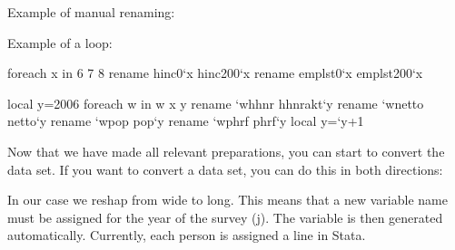 \documentclass[letterpaper,10pt,openany,onesideH,english]{sphinxmanual}
\begin{document}
Example of manual renaming:

%
\begin{sphinxVerbatim}[commandchars=\\\{\},numbers=left,firstnumber=1,stepnumber=1]
  
           
	  
	  
	  
	  
	  
\end{sphinxVerbatim}

Example of a loop:

%
\begin{sphinxVerbatim}[commandchars=\\\{\},numbers=left,firstnumber=1,stepnumber=1]
	foreach  x in 6 7 8 \PYGZob{}
		rename hinc0{}`x\PYGZsq{} hinc200{}`x\PYGZsq{}
		rename emplst0{}`x\PYGZsq{} emplst200{}`x\PYGZsq{}
		\PYGZcb{}

		
	local y=2006
	foreach w in w x y \PYGZob{}
		rename {}`w\PYGZsq{}hhnr hhnrakt{}`y\PYGZsq{}
		rename {}`w\PYGZsq{}netto netto{}`y\PYGZsq{}
		rename {}`w\PYGZsq{}pop pop{}`y\PYGZsq{}
		rename {}`w\PYGZsq{}phrf phrf{}`y\PYGZsq{}
		local y={}`y\PYGZsq{}+1
		\PYGZcb{}
\end{sphinxVerbatim}


Now that we have made all relevant preparations, you can start to convert the data set.
If you want to convert a data set, you can do this in both directions:

\begin{figure}[H]
\centering

\noindent{}
\end{figure}

In our case we reshap from wide to long. This means that a new variable name must be assigned for the year of the survey (j). The variable is then generated automatically.  Currently, each person is assigned a line in Stata.
\end{document}
